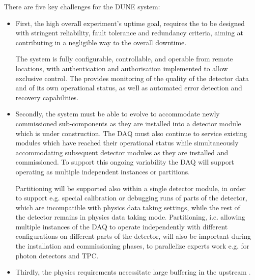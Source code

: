 




There are five key challenges for the DUNE   system: 
\begin{itemize}
\item First, the high overall experiment's uptime goal, requires the  to be designed with stringent reliability, fault tolerance and redundancy criteria, aiming at contributing in a negligible way to the overall downtime.

  The  system is fully configurable, controllable, and operable from remote locations, with authentication and authorisation implemented to allow exclusive control. The  provides monitoring of the quality of the detector data and of its own operational status, as well as automated error detection and recovery capabilities.

\item Secondly, the system must be able to evolve to accommodate newly commissioned sub-components as they are installed into a detector module which is under construction. 
  The DAQ must also continue to service existing modules which have reached their operational status while simultaneously accommodating subsequent detector modules as they are installed and commissioned. 
  To support this ongoing variability the DAQ will support operating as multiple independent instances or partitions.

  Partitioning will be supported also within a single detector module, in order to support e.g. special calibration or debugging runs of parts of the detector, which are incompatible with physics data taking settings, while the rest of the detector remains in physics data taking mode. Partitioning, i.e. allowing multiple instances of the DAQ to operate independently with different configurations on different parts of the detector, will also be important during the installation and commissioning phases, to parallelize experts work e.g. for photon detectors and TPC.

\item Thirdly, the  physics requirements necessitate large buffering in the upstream . 


\end{itemize}
